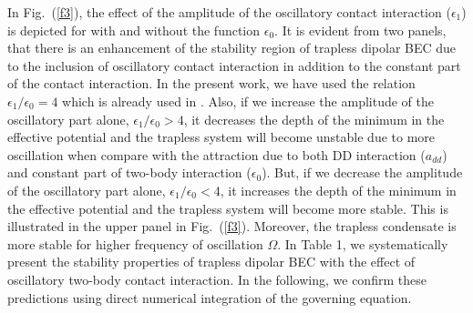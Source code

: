 \documentclass[amsmath,amssymb,article,twocolumn,superscriptaddress,showpacs,10pt]{revtex4-1}
\begin{document}
In Fig.~(\ref{f3}), the effect of the amplitude of the oscillatory contact interaction ($\epsilon_1$) is depicted for with and without the function $\epsilon_0$. It is evident from two panels, that there is an enhancement of the stability region of trapless dipolar BEC due to the inclusion of oscillatory contact interaction in addition to the constant part of the contact interaction. In the present work, we have used the relation $\epsilon_1/\epsilon_0=4$ which is already used in \cite{Sabari:2010,Adhikari:2004,Saito:2003}. Also, if we increase the amplitude of the oscillatory part alone, $\epsilon_1/\epsilon_0>4$, it decreases the depth of the minimum in the effective potential and the trapless system will become unstable due to more oscillation when compare with the attraction due to both DD interaction ($a_{dd}$) and constant part of two-body interaction ($\epsilon_0$). But, if we decrease the amplitude of the oscillatory part alone, $\epsilon_1/\epsilon_0<4$, it increases the depth of the minimum in the effective potential and the trapless system will become more stable. This is illustrated in the upper panel in Fig.~(\ref{f3}). Moreover, the trapless condensate is more stable for higher frequency of oscillation $\Omega$. In Table 1, we systematically present the stability properties of trapless dipolar BEC with the effect of oscillatory two-body contact interaction. In the following, we confirm these predictions using direct numerical integration of the governing equation.\\
\end{document}
